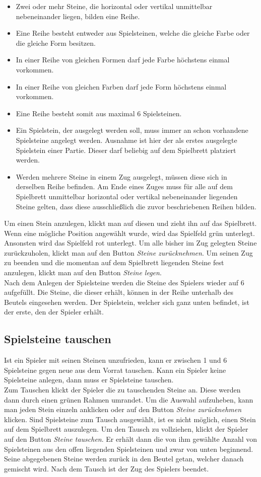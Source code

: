 \documentclass[a4paper, ngerman]{scrartcl}
\begin{document}
\begin{itemize}
\item Zwei oder mehr Steine, die horizontal oder vertikal unmittelbar nebeneinander liegen, bilden eine Reihe.
\item Eine Reihe besteht entweder aus Spielsteinen, welche die gleiche Farbe oder die gleiche Form besitzen.
\item In einer Reihe von gleichen Formen darf jede Farbe höchstens einmal vorkommen.
\item In einer Reihe von gleichen Farben darf jede Form höchstens einmal vorkommen.
\item Eine Reihe besteht somit aus maximal 6 Spielsteinen.
\item Ein Spielstein, der ausgelegt werden soll, muss immer an schon vorhandene Spielsteine angelegt werden. Ausnahme ist hier der als erstes ausgelegte Spielstein einer Partie. Dieser darf beliebig auf dem Spielbrett platziert werden.
\item Werden mehrere Steine in einem Zug ausgelegt, müssen diese sich in derselben Reihe befinden. Am Ende eines Zuges muss für alle auf dem Spielbrett unmittelbar horizontal oder vertikal nebeneinander liegenden Steine gelten, dass diese ausschließlich die zuvor beschriebenen Reihen bilden.
\end{itemize}


Um einen Stein anzulegen, klickt man auf diesen und zieht ihn auf das Spielbrett. Wenn eine mögliche Position angewählt wurde, wird das Spielfeld grün unterlegt. Ansonsten wird das Spielfeld rot unterlegt. Um alle bisher im Zug gelegten Steine zurückzuholen, klickt man auf den Button \emph{Steine zurücknehmen}. Um seinen Zug zu beenden und die momentan auf dem Spielbrett liegenden Steine fest anzulegen, klickt man auf den Button \emph{Steine legen}.\\
Nach dem Anlegen der Spielsteine werden die Steine des Spielers wieder auf 6 aufgefüllt. Die Steine, die dieser erhält, können in der Reihe unterhalb des Beutels eingesehen werden. Der Spielstein, welcher sich ganz unten befindet, ist der erste, den der Spieler erhält.
	 
\subsection{Spielsteine tauschen}
Ist ein Spieler mit seinen Steinen unzufrieden, kann er zwischen 1 und 6 Spielsteine gegen neue aus dem Vorrat tauschen. Kann ein Spieler keine Spielsteine anlegen, dann muss er Spielsteine tauschen.\\
Zum Tauschen klickt der Spieler die zu tauschenden Steine an. Diese werden dann durch einen grünen Rahmen umrandet. Um die Auswahl aufzuheben, kann man jeden Stein einzeln anklicken oder auf den Button \emph{Steine zurücknehmen} klicken. Sind Spielsteine zum Tausch ausgewählt, ist es nicht möglich, einen Stein auf dem Spielbrett auszulegen. Um den Tausch zu vollziehen, klickt der Spieler auf den Button \emph{Steine tauschen}.
 Er erhält dann die von ihm gewählte Anzahl von Spielsteinen aus den offen liegenden Spielsteinen und zwar von unten beginnend. Seine abgegebenen Steine werden zurück in den Beutel getan, welcher danach gemischt wird.
 Nach dem Tausch ist der Zug des Spielers beendet.
	
\end{document}
